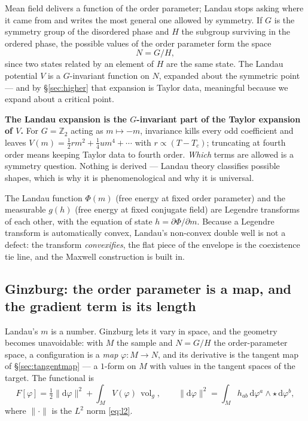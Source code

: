 \documentclass[10pt,a4paper]{article}
\newcommand{\dd}{\mathrm{d}}
\newcommand{\Z}{\mathbb{Z}}
\DeclareMathOperator{\vol}{vol}
\theoremstyle{plain}
\theoremstyle{definition}
\numberwithin{equation}{section}
\begin{document}
Mean field delivers a function of the order parameter; Landau stops asking where it came from
and writes the most general one allowed by symmetry. If $G$ is the symmetry group of the
disordered phase and $H$ the subgroup surviving in the ordered phase, the possible values of the
order parameter form the space
\begin{equation}
N=G/H ,
\label{eq:opspace}
\end{equation}
since two states related by an element of $H$ are the same state. The Landau potential $V$ is a
$G$-invariant function on $N$, expanded about the symmetric point --- and by
\S\ref{sec:higher} that expansion is Taylor data, meaningful because we expand about a critical
point.

\begin{keybox}
\textbf{The Landau expansion is the $G$-invariant part of the Taylor expansion of $V$.} For
$G=\Z_2$ acting as $m\mapsto-m$, invariance kills every odd coefficient and leaves
$V(m)=\tfrac12rm^2+\tfrac14um^4+\cdots$ with $r\propto(T-T_c)$; truncating at fourth order
means keeping Taylor data to fourth order. \emph{Which} terms are allowed is a symmetry
question. Nothing is derived --- Landau theory classifies possible shapes, which is why it is
phenomenological and why it is universal.
\end{keybox}

\noindent The Landau function $\Phi(m)$ (free energy at fixed order parameter) and the
measurable $g(h)$ (free energy at fixed conjugate field) are Legendre transforms of each other,
with the equation of state $h=\partial\Phi/\partial m$. Because a Legendre transform is
automatically convex, Landau's non-convex double well is not a defect: the transform
\emph{convexifies}, the flat piece of the envelope is the coexistence tie line, and the Maxwell
construction is built in.

\subsection{Ginzburg: the order parameter is a map, and the gradient term is its length}
\label{sec:ginzburg}

Landau's $m$ is a number. Ginzburg lets it vary in space, and the geometry becomes unavoidable:
with $M$ the sample and $N=G/H$ the order-parameter space, a configuration is a \emph{map}
$\varphi:M\to N$, and its derivative is the tangent map of \S\ref{sec:tangentmap} --- a
$1$-form on $M$ with values in the tangent spaces of the target. The functional is
\begin{equation}
F[\varphi]=\tfrac12\|\dd\varphi\|^2+\int_MV(\varphi)\,\vol_g,
\qquad
\|\dd\varphi\|^2=\int_Mh_{ab}\,\dd\varphi^a\wedge\star\,\dd\varphi^b ,
\label{eq:lgfunctional}
\end{equation}
where $\|\cdot\|$ is the $L^2$ norm \eqref{eq:l2}.
\end{document}
